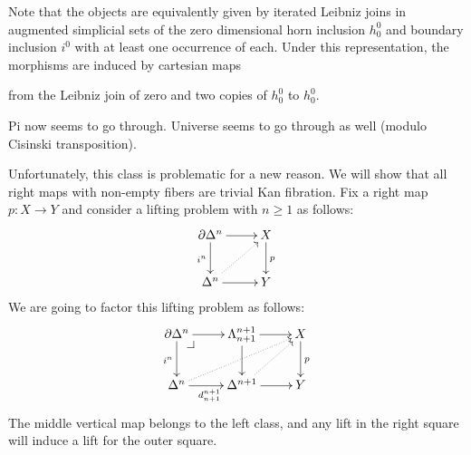 \documentclass[reqno,10pt,a4paper,oneside]{amsart}
\begin{document}

Note that the objects are equivalently given by iterated Leibniz joins in augmented simplicial sets of the zero dimensional horn inclusion $h_0^0$ and boundary inclusion $i^0$ with at least one occurrence of each.
Under this representation, the morphisms are induced by cartesian maps
from the Leibniz join of zero and two copies of $h_0^0$ to $h_0^0$.

Pi now seems to go through.
Universe seems to go through as well (modulo Cisinski transposition).

Unfortunately, this class is problematic for a new reason.
We will show that all right maps with non-empty fibers are trivial Kan fibration.
Fix a right map $p : X \to Y$ and consider a lifting problem with $n \geq 1$ as follows:
\[
\xymatrix{
  \partial \Delta^n
  \ar[r]
  \ar[d]_{i^n}
&
  X
  \ar[d]^{p}
\\
  \Delta^n
  \ar[r]
  \ar@{.>}[ur]
&
  Y
}
\]
We are going to factor this lifting problem as follows:
\[
\xymatrix{
  \partial \Delta^n
  \ar[r]
  \ar[d]_{i^n}
  \pullback{dr}
&
  \Lambda_{n+1}^{n+1}
  \ar[r]
  \ar[d]
&
  X
  \ar[d]^{p}
\\
  \Delta^n
  \ar[r]_{d_{n+1}^{n+1}}
  \ar@{.>}[urr]
&
  \Delta^{n+1}
  \ar[r]
  \ar@{.>}[ur]
&
  Y
}
\]
The middle vertical map belongs to the left class, and any lift in the right square will induce a lift for the outer square.
\end{document}
